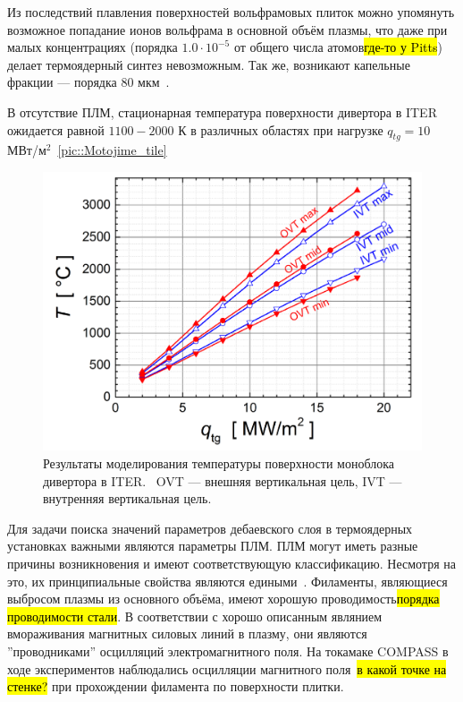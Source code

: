 Из последствий плавления поверхностей вольфрамовых плиток можно упомянуть
возможное попадание ионов вольфрама в основной объём плазмы, что даже при малых
концентрациях (порядка $1.0\cdot10^{-5}$ от общего числа атомов\hl{где-то у
Pitts}) делает термоядерный синтез невозможным. Так же, возникают капельные
фракции --- порядка 80 мкм~\cite{coenen2015elm}.

В отсутствие ПЛМ, стационарная температура поверхности дивертора в ITER
ожидается равной $1100-2000$ К в различных областях при нагрузке $q_{tg} = 10$
МВт/м$^2$~\autoref{pic::Motojime_tile}
\begin{figure}[H]
	\centering
	\includegraphics[width=0.7\linewidth]{material/Gunn_temperatures_qtg.png}
    \caption{Результаты моделирования температуры поверхности моноблока
    дивертора в ITER.~\cite{gunn2017surface} OVT --- внешняя вертикальная цель,
IVT --- внутренняя вертикальная цель.}
	\label{pic::Motojime_tile}
\end{figure}

Для задачи поиска значений параметров дебаевского слоя в
термоядерных установках важными являются параметры ПЛМ. ПЛМ могут иметь разные
причины возникновения и имеют соответствующую классификацию. Несмотря на это, 
их принципиальные свойства являются едиными~\cite{spolaore2017electromagnetic}.
Филаменты, являющиеся выбросом плазмы из основного объёма, имеют хорошую
проводимость\hl{порядка проводимости стали}. В соответствии с хорошо описанным
являнием вмораживания магнитных силовых линий в плазму, они являются
''проводниками'' осцилляций электромагнитного поля. На токамаке COMPASS в ходе
экспериментов наблюдались осцилляции магнитного поля~\hl{в какой точке на
стенке?} при прохождении филамента по поверхности плитки.


